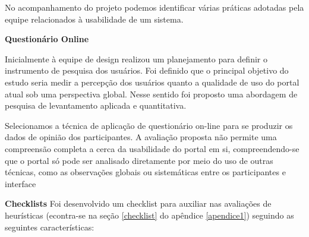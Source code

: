 No acompanhamento do projeto podemos identificar várias práticas adotadas pela equipe relacionados à usabilidade de um sistema.


\textbf{Questionário Online}

Inicialmente à equipe de design realizou um planejamento para definir o instrumento de pesquisa dos usuários. Foi definido que o principal objetivo do estudo seria medir a percepção dos usuários quanto a qualidade de uso do portal atual sob uma perspectiva global. Nesse sentido foi proposto uma abordagem de pesquisa de levantamento aplicada e quantitativa. %

Selecionamos a técnica de aplicação de questionário on-line para se produzir os dados de opinião dos participantes. A avaliação proposta não permite uma compreensão completa a cerca da usabilidade do portal em si, compreendendo-se que o portal só pode ser analisado diretamente por meio do uso de outras técnicas, como as observações globais ou sistemáticas entre os participantes e interface %


\textbf{Checklists}
	Foi desenvolvido um checklist para auxiliar nas avaliações de heurísticas (econtra-se na seção \ref{checklist} do apêndice \ref{apendice1}) seguindo as seguintes características:

	


